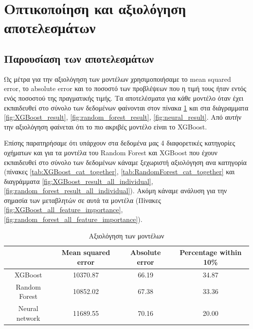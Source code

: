 \documentclass{llncs}
\begin{document}
\section{Oπτικοποίηση και αξιολόγηση αποτελεσμάτων}

\subsection{Παρουσίαση των αποτελεσμάτων}

Ως μέτρα για την αξιολόγηση των μοντέλων χρησιμοποιήσαμε το mean squared error, το absolute error και το ποσοστό των προβλέψεων που η τιμή τους 
ήταν εντός ενός ποσοστού της πραγματικής τιμής. Τα αποτελέσματα για κάθε μοντέλο όταν έχει εκπαιδευθεί στο σύνολο των δεδομένων
φαίνονται στον πίνακα \ref{tab:3x3table} και στα διάγραμματα \ref{fig:XGBoost_result}, 
\ref{fig:random_forest_result}, \ref{fig:neural_result}. Από αυτήν την αξιολόγηση φαίνεται ότι το πιο ακριβές μοντέλο
είναι το XGBoost.

Επίσης παρατηρήσαμε ότι υπάρχουν στα δεδομένα μας 4 διαφορετικές κατηγορίες οχήματων και
για τα μοντέλα του Random Forest και XGBoost που έχουν εκπαιδευθεί στο σύνολο των δεδομένων
κάναμε ξεχωριστή αξιολόγηση ανα κατηγορία 
(πίνακες \ref{tab:XGBoost_cat_together}, \ref{tab:RandomForest_cat_together} 
και διαγράμματα 
\ref{fig:XGBoost_result_all_individual}, \ref{fig:random_forest_result_all_individual}). Ακόμη κάναμε ανάλυση για την σημασία των μεταβλητών σε αυτά τα μοντέλα 
(Πίνακες \ref{fig:XGBoost_all_feature_importance}, 
\ref{fig:random_forest_all_feature_importance}).




\begin{table}
    \centering
    \begin{tabular}{|c|c|c|c|} %
        \hline
         &Mean squared error & Absolute error & Percentage within 10\% \\ %
        \hline
        XGBoost & 10370.87 & 66.19 & 34.87 \\
        Random Forest & 10852.02 & 67.38 & 33.36 \\
        Neural network & 11689.55 & 70.16 & 20.00 \\
        \hline
    \end{tabular}
    \caption{Αξιολόγηση των μοντέλων}
    \label{tab:3x3table}
\end{table}
\end{document}
